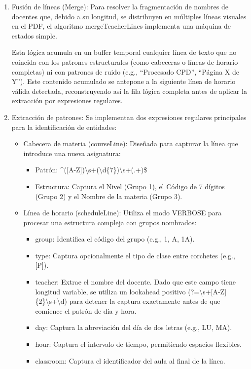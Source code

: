 \begin{enumerate}
    \item Fusión de líneas (Merge): Para resolver la fragmentación de nombres de docentes que, debido a su longitud, se distribuyen en múltiples líneas visuales en el PDF, el algoritmo mergeTeacherLines implementa una máquina de estados simple.

    Esta lógica acumula en un buffer temporal cualquier línea de texto que no coincida con los patrones estructurales (como cabeceras o líneas de horario completas) ni con patrones de ruido (e.g., ``Procesado CPD'', ``Página X de Y''). Este contenido acumulado se antepone a la siguiente línea de horario válida detectada, reconstruyendo así la fila lógica completa antes de aplicar la extracción por expresiones regulares.
    
    \item Extracción de patrones: Se implementan dos expresiones regulares principales para la identificación de entidades:
    
    \begin{itemize}
        \item Cabecera de materia (courseLine): Diseñada para capturar la línea que introduce una nueva asignatura:
        \begin{itemize}
            \item Patrón: \textasciicircum([A-Z])\textbackslash s+(\textbackslash d\{7\})\textbackslash s+(.+)\$
            \item Estructura: Captura el Nivel (Grupo 1), el Código de 7 dígitos (Grupo 2) y el Nombre de la materia (Grupo 3).
        \end{itemize}
        
        \item Línea de horario (scheduleLine): Utiliza el modo VERBOSE para procesar una estructura compleja con grupos nombrados:
        \begin{itemize}
            \item group: Identifica el código del grupo (e.g., 1, A, 1A).
            \item type: Captura opcionalmente el tipo de clase entre corchetes (e.g., [P]).
            \item teacher: Extrae el nombre del docente. Dado que este campo tiene longitud variable, se utiliza un lookahead positivo (?=\textbackslash s+[A-Z]\{2\}\textbackslash s+\textbackslash d) para detener la captura exactamente antes de que comience el patrón de día y hora.
            \item day: Captura la abreviación del día de dos letras (e.g., LU, MA).
            \item hour: Captura el intervalo de tiempo, permitiendo espacios flexibles.
            \item classroom: Captura el identificador del aula al final de la línea.
        \end{itemize}
    \end{itemize}
\end{enumerate}

